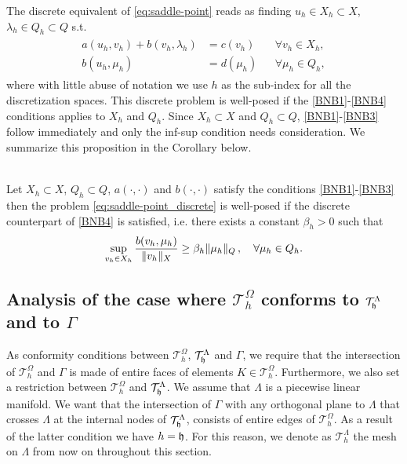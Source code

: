 \documentclass[r]{siamart171218}
\newcommand{\kentold}[1]{{\color{black}#1}}
\begin{document}
The discrete equivalent of \eqref{eq:saddle-point} reads as finding $u_h\in X_h\subset X$, $\lambda_h\in Q_h\subset Q$ s.t.
\begin{eqnarray}\label{eq:saddle-point_discrete}
\begin{aligned}
a(u_h,v_h)+b(v_h,\lambda_h)&=c(v_h) &&\forall v_h\in X_h,\\
b(u_h,\mu_h)&=d(\mu_h) &&\forall \mu_h\in Q_h,
\end{aligned}
\end{eqnarray}
where with little abuse of notation we use $h$ as the sub-index for all the discretization spaces.
This discrete problem is well-posed if the \eqref{BNB1}-\eqref{BNB4} conditions applies to $X_h$ and $Q_h$. Since $X_h\subset X$ and $Q_h\subset Q$,  
\eqref{BNB1}-\eqref{BNB3} follow immediately and only the inf-sup condition needs consideration.  We summarize this proposition in the Corollary below. 
\begin{corollary}{\cite[Theorem 2.42]{MR2050138}}\\
Let
$X_h \subset X$, $Q_h \subset Q$, $a(\cdot, \cdot)$ and $b(\cdot, \cdot)$ satisfy the conditions  \eqref{BNB1}-\eqref{BNB3} then  
the problem \eqref{eq:saddle-point_discrete} is well-posed if 
the discrete counterpart of \eqref{BNB4} is satisfied, i.e.
there exists a constant $\beta_h>0$ such that
\begin{align}
\label{eq:infsup_discrete}
 \sup_{v_h\in X_h} \frac{b(v_h,\mu_h)}{\|v_h\|_{X}}\geq \beta_h \|\mu_h\|_{Q}\,, \kentold{\quad \forall \mu_h \in Q_h.}
\end{align}
\end{corollary}


\subsection{Analysis of the case where $\mathcal{T}^{\Omega}_h$ conforms to $\mathcal{T}^{\Lambda}_{\mathfrak{h}}$ and to $\Gamma$}
As conformity conditions between $\mathcal{T}^{\Omega}_h$, $\mathcal{T}^{\Lambda}_{\mathfrak{h}}$ and $\Gamma$, we require that the intersection of $\mathcal{T}^{\Omega}_h$ and $\Gamma$ is made of entire faces of elements $K \in \mathcal{T}^{\Omega}_h$. Furthermore, we also set a restriction between $\mathcal{T}^{\Omega}_h$ and $\mathcal{T}^{\Lambda}_{\mathfrak{h}}$. We assume that $\Lambda$ is a piecewise linear manifold. We want that the intersection of $\Gamma$ with any orthogonal plane to $\Lambda$ that crosses $\Lambda$ at the internal nodes of $\mathcal{T}^{\Lambda}_{\mathfrak{h}}$, consists of entire edges of $\mathcal{T}^{\Omega}_h$. As a result of the latter condition we have $h=\mathfrak{h}$. 
For this reason, we denote as $\mathcal{T}^{\Lambda}_h$ the mesh on $\Lambda$
from now on throughout this section.
 
\end{document}
